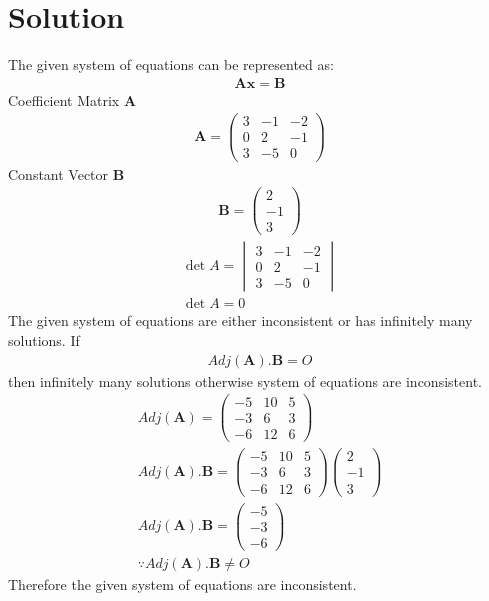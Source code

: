 \documentclass[journal,13pt,twocolumn]{IEEEtran}
\newcommand{\myvec}[1]{\ensuremath{\begin{pmatrix}#1\end{pmatrix}}}
\newcommand{\mydet}[1]{\ensuremath{\begin{vmatrix}#1\end{vmatrix}}}
\renewcommand{\vec}[1]{\mathbf{#1}}
\begin{document}
\section{\textbf{Solution}}
The given system of equations can be represented as:
 \begin{align}
 \vec{A}\vec{x}=\vec{B}
 \end{align}
Coefficient Matrix $\vec{A}$
\begin{align}
\vec{A} = \myvec
            {3 & -1 & -2\\
            0 & 2 & -1\\
            3 & -5 & 0}  
\end{align}   
Constant Vector $\vec{B}$
\begin{align}                         
\vec{B} = \myvec{
            2\\
            -1\\
            3}
\end{align}      
\begin{align}
\det{A} = \mydet
           {3 & -1 & -2\\
            0 & 2 & -1\\
            3 & -5 & 0}\\
\det{A} =  0 
\end{align}
The given system of equations are either inconsistent or has infinitely many solutions.
If
\begin{align}
  Adj(\vec{A}).\vec{B} = O
\end{align}
then infinitely many solutions
otherwise system of equations are inconsistent.
\begin{align}
 Adj(\vec{A}) = \myvec
            {-5 & 10 & 5\\
            -3 & 6 & 3\\
            -6 & 12 & 6}\\
 Adj(\vec{A}).\vec{B} = \myvec
            {-5 & 10 & 5\\
            -3 & 6 & 3\\
            -6 & 12 & 6}
            \myvec{
            2\\
            -1\\
            3}\\
 Adj(\vec{A}).\vec{B} =   \myvec{
            -5\\
            -3\\
            -6}\\
 \because Adj(\vec{A}).\vec{B} \neq O                               
\end{align}
 Therefore  the given system of equations are inconsistent. 
 
\end{document}
